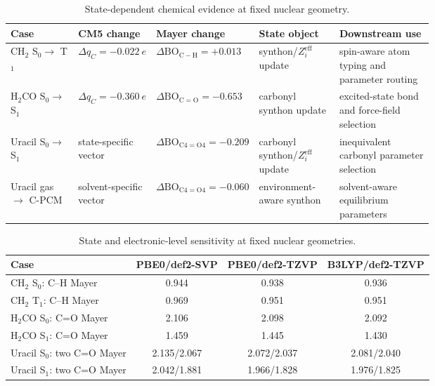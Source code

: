 \documentclass[journal=jctcce,manuscript=article]{achemso}
\begin{document}
\begin{table}[htbp]
\centering
\scriptsize
\caption{State-dependent chemical evidence at fixed nuclear geometry.}
\label{tab:state-chemical-consequences}
\begin{tabularx}{\linewidth}{@{}p{0.16\linewidth}p{0.17\linewidth}p{0.18\linewidth}p{0.19\linewidth}X@{}}
\toprule
\textbf{Case} & \textbf{CM5 change} & \textbf{Mayer change} &
\textbf{State object} & \textbf{Downstream use}\\
\midrule
CH$_2$ S$_0\!\to$ T$_1$ & $\Delta q_C=-0.022~e$ & $\Delta\mathrm{BO}_{\mathrm{C-H}}=+0.013$ & synthon/$Z_i^{\mathrm{eff}}$ update & spin-aware atom typing and parameter routing\\
H$_2$CO S$_0\!\to$ S$_1$ & $\Delta q_C=-0.360~e$ & $\Delta\mathrm{BO}_{\mathrm{C=O}}=-0.653$ & carbonyl synthon update & excited-state bond and force-field selection\\
Uracil S$_0\!\to$ S$_1$ & state-specific vector & $\Delta\mathrm{BO}_{\mathrm{C4=O4}}=-0.209$ & carbonyl synthon/$Z_i^{\mathrm{eff}}$ update & inequivalent carbonyl parameter selection\\
Uracil gas $\to$ C-PCM & solvent-specific vector & $\Delta\mathrm{BO}_{\mathrm{C4=O4}}=-0.060$ & environment-aware synthon & solvent-aware equilibrium parameters\\
\bottomrule
\end{tabularx}
\end{table}

\begin{table}[htbp]
\centering
\scriptsize
\caption{State and electronic-level sensitivity at fixed nuclear geometries.}
\label{tab:state-level-sensitivity}
\begin{tabular}{@{}lccc@{}}
\toprule
Case & PBE0/def2-SVP & PBE0/def2-TZVP & B3LYP/def2-TZVP \\
\midrule
CH$_2$ S$_0$: C--H Mayer & 0.944 & 0.938 & 0.936 \\
CH$_2$ T$_1$: C--H Mayer & 0.969 & 0.951 & 0.951 \\
H$_2$CO S$_0$: C=O Mayer & 2.106 & 2.098 & 2.092 \\
H$_2$CO S$_1$: C=O Mayer & 1.459 & 1.445 & 1.430 \\
Uracil S$_0$: two C=O Mayer & 2.135/2.067 & 2.072/2.037 & 2.081/2.040 \\
Uracil S$_1$: two C=O Mayer & 2.042/1.881 & 1.966/1.828 & 1.976/1.825 \\
\bottomrule
\end{tabular}
\end{table}
\end{document}
